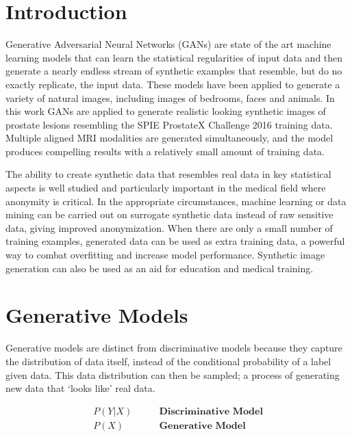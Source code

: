\documentclass[a4paper,12pt]{spieman}  %
\begin{document}
\begin{spacing}{1}

\section{Introduction}

	Generative Adversarial Neural Networks (GANs) are state of the art
	machine learning models that can learn the statistical regularities of
	input data and then generate a nearly endless stream of synthetic
	examples that resemble, but do no exactly replicate, the input
	data\cite{NIPS2014_5423}.  These models have been applied to generate a
	variety of natural images, including images of bedrooms,
	faces\cite{DBLP:journals/corr/RadfordMC15} and
	animals\cite{NIPS2016_6125}.  In this work GANs are applied to
	generate realistic looking synthetic images of prostate lesions
	resembling the SPIE ProstateX Challenge 2016 training data.  Multiple
	aligned MRI modalities are generated simultaneously, and the model
	produces compelling results with a relatively small amount of training
	data.

	The ability to create synthetic data that resembles real data in key
	statistical aspects is well studied and particularly important in the
	medical field where anonymity is critical. In the appropriate
	circumstances, machine learning or data mining can be carried out on
	surrogate synthetic data instead of raw sensitive data, giving improved
	anonymization. When there are only a small number of training examples,
	generated data can be used as extra training data, a powerful way to
	combat overfitting and increase model performance\cite{NIPS2016_6125}.
	Synthetic image generation can also be used as an aid for education and
	medical training.

\section{Generative Models}

	Generative models are distinct from discriminative models because they
	capture the distribution of data itself, instead of the conditional
	probability of a label given data. This data distribution can then be
	sampled; a process of generating new data that `looks like' real data.

	\begin{align*}
		P(Y|X) &\qquad \textbf{Discriminative Model} \\
		P(X)   &\qquad \textbf{Generative Model}
	\end{align*}


\end{spacing}
\end{document}
